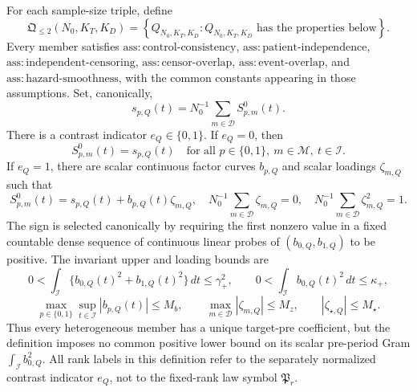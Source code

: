 For each sample-size triple, define
\[
\mathfrak Q_{\leq 2}(N_0,K_T,K_D)
=\left\{Q_{N_0,K_T,K_D}:Q_{N_0,K_T,K_D}
\text{ has the properties below}\right\}.
\]
Every member satisfies
\(\mathrm{ass:control\mbox{-}consistency}\),
\(\mathrm{ass:patient\mbox{-}independence}\),
\(\mathrm{ass:independent\mbox{-}censoring}\),
\(\mathrm{ass:censor\mbox{-}overlap}\),
\(\mathrm{ass:event\mbox{-}overlap}\), and
\(\mathrm{ass:hazard\mbox{-}smoothness}\), with the common constants appearing in
those assumptions.  Set, canonically,
\[
s_{p,Q}(t)=N_0^{-1}\sum_{m\in\mathcal D}S^0_{p,m}(t).
\]
There is a contrast indicator \(e_Q\in\{0,1\}\).  If \(e_Q=0\), then
\[
S^0_{p,m}(t)=s_{p,Q}(t)
\quad\text{for all }p\in\{0,1\},\ m\in\mathcal M,\ t\in\mathcal I.
\]
If \(e_Q=1\), there are scalar continuous factor curves \(b_{p,Q}\) and scalar
loadings \(\zeta_{m,Q}\) such that
\[
S^0_{p,m}(t)=s_{p,Q}(t)+b_{p,Q}(t)\zeta_{m,Q},
\quad
N_0^{-1}\sum_{m\in\mathcal D}\zeta_{m,Q}=0,
\quad
N_0^{-1}\sum_{m\in\mathcal D}\zeta_{m,Q}^2=1.
\]
The sign is selected canonically by requiring the first nonzero value in a fixed
countable dense sequence of continuous linear probes of
\((b_{0,Q},b_{1,Q})\) to be positive.  The invariant upper and loading bounds are
\[
0<\int_{\mathcal I}\{b_{0,Q}(t)^2+b_{1,Q}(t)^2\}\,dt\leq\gamma_+^2,
\qquad
0<\int_{\mathcal I}b_{0,Q}(t)^2\,dt\leq\kappa_+,
\]
\[
\max_{p\in\{0,1\}}\sup_{t\in\mathcal I}|b_{p,Q}(t)|\leq M_b,
\qquad
\max_{m\in\mathcal D}|\zeta_{m,Q}|\leq M_z,
\qquad
|\zeta_{\star,Q}|\leq M_\star.
\]
Thus every heterogeneous member has a unique target-pre coefficient, but the
definition imposes no common positive lower bound on its scalar pre-period Gram
\(\int_{\mathcal I}b_{0,Q}^2\).  All rank labels in this definition refer to the
separately normalized contrast indicator \(e_Q\), not to the fixed-rank law symbol
\(\mathfrak P_r\).